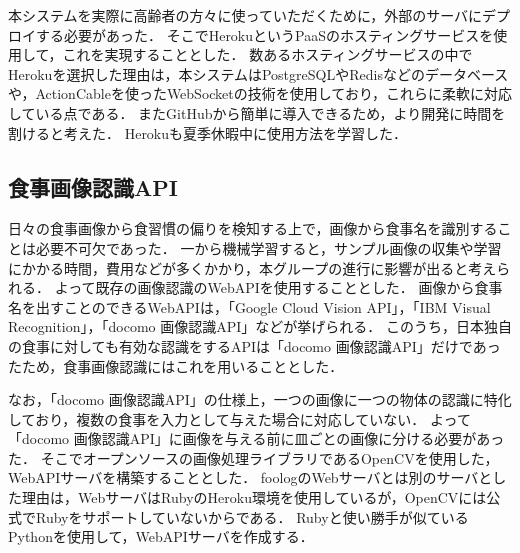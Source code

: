 \documentclass[../report]{subfiles}
\begin{document}
本システムを実際に高齢者の方々に使っていただくために，外部のサーバにデプロイする必要があった．
そこでHerokuというPaaSのホスティングサービスを使用して，これを実現することとした．
数あるホスティングサービスの中でHerokuを選択した理由は，本システムはPostgreSQLやRedisなどのデータベースや，ActionCableを使ったWebSocketの技術を使用しており，これらに柔軟に対応している点である．
またGitHubから簡単に導入できるため，より開発に時間を割けると考えた．
Herokuも夏季休暇中に使用方法を学習した．


\subsection{食事画像認識API} \label{sec:3-food-recognition}
日々の食事画像から食習慣の偏りを検知する上で，画像から食事名を識別することは必要不可欠であった．
一から機械学習すると，サンプル画像の収集や学習にかかる時間，費用などが多くかかり，本グループの進行に影響が出ると考えられる．
よって既存の画像認識のWebAPIを使用することとした．
画像から食事名を出すことのできるWebAPIは，「Google Cloud Vision API」，「IBM Visual Recognition」，「docomo 画像認識API」などが挙げられる．
このうち，日本独自の食事に対しても有効な認識をするAPIは「docomo 画像認識API」だけであったため，食事画像認識にはこれを用いることとした．

なお，「docomo 画像認識API」の仕様上，一つの画像に一つの物体の認識に特化しており，複数の食事を入力として与えた場合に対応していない．
よって「docomo 画像認識API」に画像を与える前に皿ごとの画像に分ける必要があった．
そこでオープンソースの画像処理ライブラリであるOpenCVを使用した，WebAPIサーバを構築することとした．
foologのWebサーバとは別のサーバとした理由は，WebサーバはRubyのHeroku環境を使用しているが，OpenCVには公式でRubyをサポートしていないからである．
Rubyと使い勝手が似ているPythonを使用して，WebAPIサーバを作成する．
\end{document}
